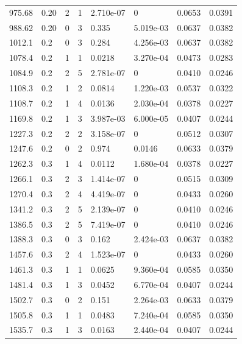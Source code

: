 \documentclass[preview]{standalone}
\begin{document}
{{{\begin{tabular}{L{1.2cm}C{1.2cm} C{0.3cm}C{0.5cm} C{1.4cm}C{1.4cm} C{1.4cm}C{1.4cm}}
  975.68  &  0.20  & 2     &  1 &  2.710e-07  & 0  & 0.0653 &  0.0391   \\ 
  988.62  &  0.20  & 0     &  3 &  0.335  & 5.019e-03  & 0.0637 &  0.0382   \\ 
  1012.1  &   0.2  & 0     &  3 &  0.284  & 4.256e-03  & 0.0637 &  0.0382   \\ 
  1078.4  &   0.2  & 1     &  1 &  0.0218  & 3.270e-04  & 0.0473 &  0.0283   \\ 
  1084.9  &   0.2  & 2     &  5 &  2.781e-07  & 0  & 0.0410 &  0.0246   \\ 
  1108.3  &   0.2  & 1     &  2 &  0.0814  & 1.220e-03  & 0.0537 &  0.0322   \\ 
  1108.7  &   0.2  & 1     &  4 &  0.0136  & 2.030e-04  & 0.0378 &  0.0227   \\ 
  1169.8  &   0.2  & 1     &  3 &  3.987e-03  & 6.000e-05  & 0.0407 &  0.0244   \\ 
  1227.3  &   0.2  & 2     &  2 &  3.158e-07  & 0  & 0.0512 &  0.0307   \\ 
  1247.6  &   0.2  & 0     &  2 &  0.974  & 0.0146  & 0.0633 &  0.0379   \\ 
  1262.3  &   0.3  & 1     &  4 &  0.0112  & 1.680e-04  & 0.0378 &  0.0227   \\ 
  1266.1  &   0.3  & 2     &  3 &  1.414e-07  & 0  & 0.0515 &  0.0309   \\ 
  1270.4  &   0.3  & 2     &  4 &  4.419e-07  & 0  & 0.0433 &  0.0260   \\ 
  1341.2  &   0.3  & 2     &  5 &  2.139e-07  & 0  & 0.0410 &  0.0246   \\ 
  1386.5  &   0.3  & 2     &  5 &  7.419e-07  & 0  & 0.0410 &  0.0246   \\ 
  1388.3  &   0.3  & 0     &  3 &  0.162  & 2.424e-03  & 0.0637 &  0.0382   \\ 
  1457.6  &   0.3  & 2     &  4 &  1.523e-07  & 0  & 0.0433 &  0.0260   \\ 
  1461.3  &   0.3  & 1     &  1 &  0.0625  & 9.360e-04  & 0.0585 &  0.0350   \\ 
  1481.4  &   0.3  & 1     &  3 &  0.0452  & 6.770e-04  & 0.0407 &  0.0244   \\ 
  1502.7  &   0.3  & 0     &  2 &  0.151  & 2.264e-03  & 0.0633 &  0.0379   \\ 
  1505.8  &   0.3  & 1     &  1 &  0.0483  & 7.240e-04  & 0.0585 &  0.0350   \\ 
  1535.7  &   0.3  & 1     &  3 &  0.0163  & 2.440e-04  & 0.0407 &  0.0244   \\ 

\end{tabular}}}}
\end{document}
